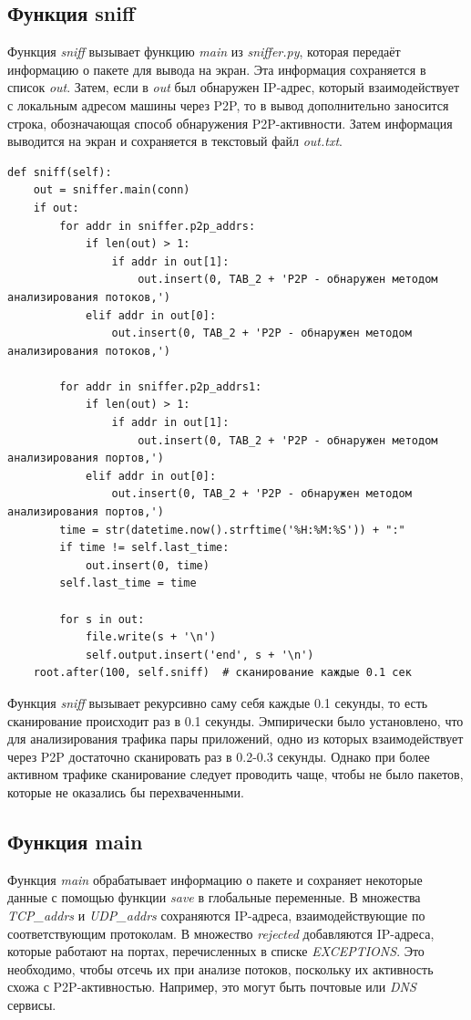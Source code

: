 \documentclass[bachelor, och, coursework]{SCWorks}
\begin{document}
\subsection{Функция sniff}
Функция \textit{sniff} вызывает функцию \textit{main} из \textit{sniffer.py}, которая передаёт информацию о пакете для вывода на экран. Эта информация сохраняется в список \textit{out}. Затем, если в \textit{out} был обнаружен IP-адрес, который взаимодействует с локальным адресом машины через P2P, то в вывод дополнительно заносится строка, обозначающая способ обнаружения P2P-активности. Затем информация выводится на экран и сохраняется в текстовый файл \textit{out.txt}.

\begin{verbatim}
def sniff(self):
    out = sniffer.main(conn)
    if out:
        for addr in sniffer.p2p_addrs:
            if len(out) > 1:
                if addr in out[1]:
                    out.insert(0, TAB_2 + 'P2P - обнаружен методом анализирования потоков,')
            elif addr in out[0]:
                out.insert(0, TAB_2 + 'P2P - обнаружен методом анализирования потоков,')

        for addr in sniffer.p2p_addrs1:
            if len(out) > 1:
                if addr in out[1]:
                    out.insert(0, TAB_2 + 'P2P - обнаружен методом анализирования портов,')
            elif addr in out[0]:
                out.insert(0, TAB_2 + 'P2P - обнаружен методом анализирования портов,')
        time = str(datetime.now().strftime('%H:%M:%S')) + ":"
        if time != self.last_time:
            out.insert(0, time)
        self.last_time = time

        for s in out:
            file.write(s + '\n')
            self.output.insert('end', s + '\n')
    root.after(100, self.sniff)  # сканирование каждые 0.1 сек
\end{verbatim}

Функция \textit{sniff} вызывает рекурсивно саму себя каждые 0.1 секунды, то есть сканирование происходит раз в 0.1 секунды.
Эмпирически было установлено, что для анализирования трафика пары приложений, одно из которых взаимодействует через P2P достаточно сканировать раз в 0.2-0.3 секунды. Однако при более активном трафике сканирование следует проводить чаще, чтобы не было пакетов, которые не оказались бы перехваченными.

\subsection{Функция main}
Функция \textit{main} обрабатывает информацию о пакете и сохраняет некоторые данные с помощью функции \textit{save} в глобальные переменные.
В множества \textit{TCP_addrs} и \textit{UDP_addrs} сохраняются IP-адреса, взаимодействующие по соответствующим протоколам.
В множество \textit{rejected} добавляются IP-адреса, которые работают на портах, перечисленных в списке \textit{EXCEPTIONS}. 
Это необходимо, чтобы отсечь их при анализе потоков, поскольку их активность схожа с P2P-активностью. Например, это могут быть 
почтовые или \textit{DNS} сервисы.
\end{document}
